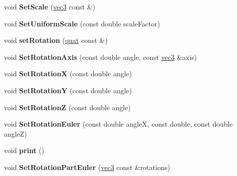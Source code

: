 \begin{DoxyCompactItemize}
\item 
\hypertarget{classmath_1_1mat33_ae8af73e15d9005cf98d15fe888e4de80}{
void {\bfseries SetScale} (\hyperlink{classmath_1_1vec3}{vec3} const \&)}
\label{classmath_1_1mat33_ae8af73e15d9005cf98d15fe888e4de80}

\item 
\hypertarget{classmath_1_1mat33_aa88037571c69f1216ebafb0558269689}{
void {\bfseries SetUniformScale} (const double scaleFactor)}
\label{classmath_1_1mat33_aa88037571c69f1216ebafb0558269689}

\item 
\hypertarget{classmath_1_1mat33_a71a1821a3b774552fca810b4ad645258}{
void {\bfseries setRotation} (\hyperlink{classmath_1_1quat}{quat} const \&)}
\label{classmath_1_1mat33_a71a1821a3b774552fca810b4ad645258}

\item 
\hypertarget{classmath_1_1mat33_abbb169acd0c9b5ab2cb00363269a86b1}{
void {\bfseries SetRotationAxis} (const double angle, const \hyperlink{classmath_1_1vec3}{vec3} \&axis)}
\label{classmath_1_1mat33_abbb169acd0c9b5ab2cb00363269a86b1}

\item 
\hypertarget{classmath_1_1mat33_a84e8401171377b65df945876d58ec827}{
void {\bfseries SetRotationX} (const double angle)}
\label{classmath_1_1mat33_a84e8401171377b65df945876d58ec827}

\item 
\hypertarget{classmath_1_1mat33_a21da886ff466bd5f4636893368cfb698}{
void {\bfseries SetRotationY} (const double angle)}
\label{classmath_1_1mat33_a21da886ff466bd5f4636893368cfb698}

\item 
\hypertarget{classmath_1_1mat33_af60df05ce322e741c338eb80f327de83}{
void {\bfseries SetRotationZ} (const double angle)}
\label{classmath_1_1mat33_af60df05ce322e741c338eb80f327de83}

\item 
\hypertarget{classmath_1_1mat33_a941af43c45ffd4b74643a0262563c3cd}{
void {\bfseries SetRotationEuler} (const double angleX, const double, const double angleZ)}
\label{classmath_1_1mat33_a941af43c45ffd4b74643a0262563c3cd}

\item 
\hypertarget{classmath_1_1mat33_aec1ee83e1f82fdba64beb97873aacb29}{
void {\bfseries print} ()}
\label{classmath_1_1mat33_aec1ee83e1f82fdba64beb97873aacb29}

\item 
\hypertarget{classmath_1_1mat33_aaba12d28f91d3b1947ca24be61c39052}{
void {\bfseries SetRotationPartEuler} (\hyperlink{classmath_1_1vec3}{vec3} const \&rotations)}
\label{classmath_1_1mat33_aaba12d28f91d3b1947ca24be61c39052}


\end{DoxyCompactItemize}
